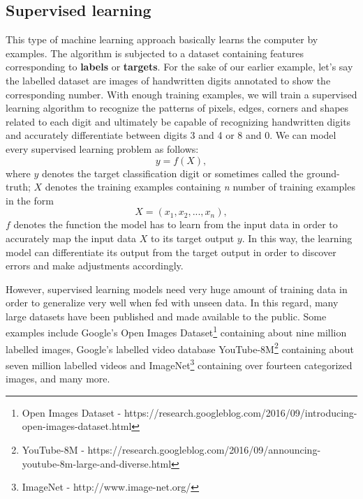 \documentclass[master]{thesis-uestc}
\begin{document}
\subsection{Supervised learning}
This type of machine learning approach basically learns the computer by examples. The algorithm is subjected to a dataset containing features corresponding to \textbf{labels} or \textbf{targets}. For the sake of our earlier example, let's say the labelled dataset are images of handwritten digits annotated to show the corresponding number. With enough training examples, we will train a supervised learning algorithm to recognize the patterns of pixels, edges, corners and shapes related to each digit and ultimately be capable of recognizing handwritten digits and accurately differentiate between digits 3 and 4 or 8 and 0. We can model every supervised learning problem as follows:
\begin{equation}
y = f (X),
\end{equation}
where $y$ denotes the target classification digit or sometimes called the ground-truth; $X$ denotes the training examples containing \textit{n} number of training examples in the form \[X = (x_1, x_2,...,x_n),\] $f$ denotes the function the model has to learn from the input data in order to accurately map the input data $X$ to its target output $y$. In this way, the learning model can differentiate its output from the target output in order to discover errors and make adjustments accordingly.

However, supervised learning models need very huge amount of training data in order to generalize very well when fed with unseen data. In this regard, many large datasets have been published and made available to the public. Some examples include Google's Open Images Dataset\footnote{Open Images Dataset - https://research.googleblog.com/2016/09/introducing-open-images-dataset.html} containing about nine million labelled images, Google's labelled video database YouTube-8M\footnote{YouTube-8M - https://research.googleblog.com/2016/09/announcing-youtube-8m-large-and-diverse.html} containing about seven million labelled videos and ImageNet\footnote{ImageNet - http://www.image-net.org/} containing over fourteen categorized images, and many more.
\end{document}
